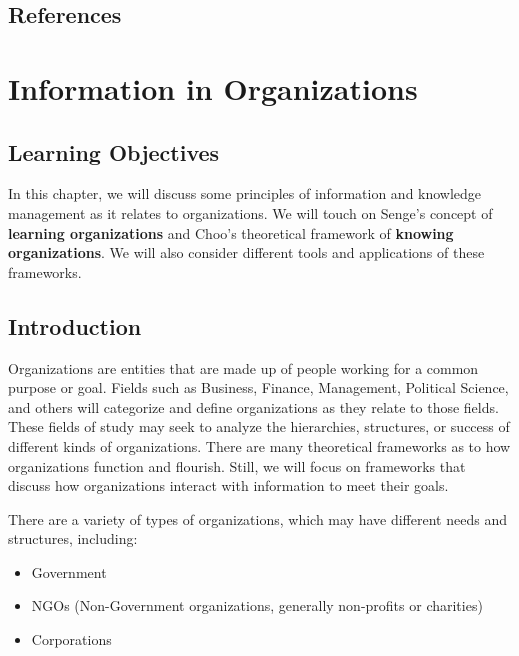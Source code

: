 \documentclass[
  letterpaper,
  DIV=11,
  numbers=noendperiod]{scrreprt}
\begin{document}
\section{References}\label{references-4}


\chapter{Information in
Organizations}\label{information-in-organizations}

\section{Learning Objectives}\label{learning-objectives-4}

In this chapter, we will discuss some principles of information and
knowledge management as it relates to organizations. We will touch on
Senge's concept of \textbf{learning organizations} and Choo's
theoretical framework of \textbf{knowing organizations}. We will also
consider different tools and applications of these frameworks.

\section{\texorpdfstring{\textbf{Introduction}}{Introduction}}\label{introduction-1}

Organizations are entities that are made up of people working for a
common purpose or goal. Fields such as Business, Finance, Management,
Political Science, and others will categorize and define organizations
as they relate to those fields. These fields of study may seek to
analyze the hierarchies, structures, or success of different kinds of
organizations. There are many theoretical frameworks as to how
organizations function and flourish. Still, we will focus on frameworks
that discuss how organizations interact with information to meet their
goals.

There are a variety of types of organizations, which may have different
needs and structures, including:

\begin{itemize}
\item
  Government
\item
  NGOs (Non-Government organizations, generally non-profits or
  charities)
\item
  Corporations
\end{itemize}
\end{document}
